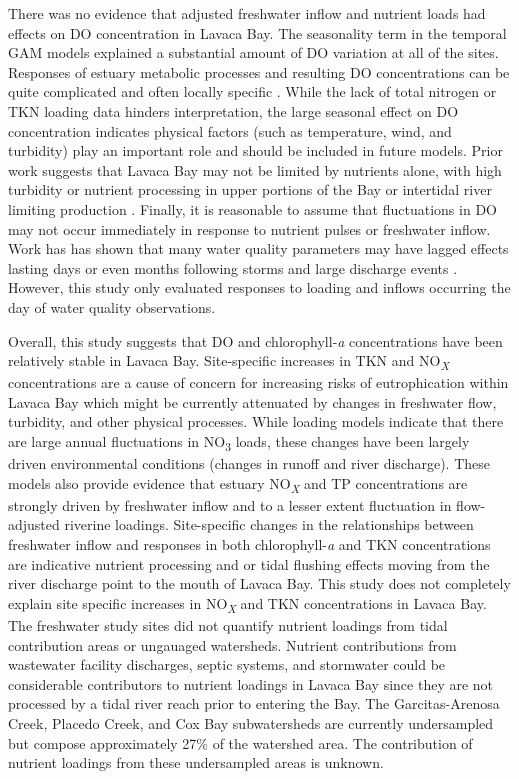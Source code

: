 \documentclass[fleqn,10pt,lineno]{wlpeerj} %
\begin{document}
There was no evidence that adjusted freshwater inflow and nutrient loads
had effects on DO concentration in Lavaca Bay. The seasonality term in
the temporal GAM models explained a substantial amount of DO variation
at all of the sites. Responses of estuary metabolic processes and
resulting DO concentrations can be quite complicated and often locally
specific \autocite{caffreyFactorsControllingNet2004}. While the lack of
total nitrogen or TKN loading data hinders interpretation, the large
seasonal effect on DO concentration indicates physical factors (such as
temperature, wind, and turbidity) play an important role and should be
included in future models. Prior work suggests that Lavaca Bay may not
be limited by nutrients alone, with high turbidity or nutrient
processing in upper portions of the Bay or intertidal river limiting
production \autocite{russell_effect_2006}. Finally, it is reasonable to
assume that fluctuations in DO may not occur immediately in response to
nutrient pulses or freshwater inflow. Work has has shown that many water
quality parameters may have lagged effects lasting days or even months
following storms and large discharge events
\autocite{mooneyWatershedExportEvents2012a,wetzExtremeFutureEstuaries2013,bukaveckasInfluenceStormEvents2020,walkerTimescalesMagnitudeWater2021}.
However, this study only evaluated responses to loading and inflows
occurring the day of water quality observations.

Overall, this study suggests that DO and chlorophyll-\emph{a}
concentrations have been relatively stable in Lavaca Bay. Site-specific
increases in TKN and NO\textsubscript{\emph{X}} concentrations are a
cause of concern for increasing risks of eutrophication within Lavaca
Bay which might be currently attenuated by changes in freshwater flow,
turbidity, and other physical processes. While loading models indicate
that there are large annual fluctuations in NO\textsubscript{3} loads,
these changes have been largely driven environmental conditions (changes
in runoff and river discharge). These models also provide evidence that
estuary NO\textsubscript{\emph{X}} and TP concentrations are strongly
driven by freshwater inflow and to a lesser extent fluctuation in
flow-adjusted riverine loadings. Site-specific changes in the
relationships between freshwater inflow and responses in both
chlorophyll-\emph{a} and TKN concentrations are indicative nutrient
processing and or tidal flushing effects moving from the river discharge
point to the mouth of Lavaca Bay. This study does not completely explain
site specific increases in NO\textsubscript{\emph{X}} and TKN
concentrations in Lavaca Bay. The freshwater study sites did not
quantify nutrient loadings from tidal contribution areas or ungauaged
watersheds. Nutrient contributions from wastewater facility discharges,
septic systems, and stormwater could be considerable contributors to
nutrient loadings in Lavaca Bay since they are not processed by a tidal
river reach prior to entering the Bay. The Garcitas-Arenosa Creek,
Placedo Creek, and Cox Bay subwatersheds are currently undersampled but
compose approximately 27\% of the watershed area. The contribution of
nutrient loadings from these undersampled areas is unknown.
\end{document}
